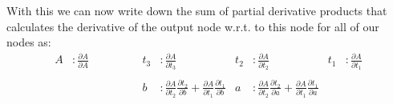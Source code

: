 \vspace{0.5cm}

With this we can now write down the sum of partial derivative products that calculates the derivative of
the output node w.r.t. to this node for all of our nodes as:
\begin{equation}
    \begin{aligned}
        A&: \frac{\partial A}{\partial A} & t_3&: \frac{\partial A}{\partial t_3} & t_2&: \frac{\partial A}{\partial t_2} & t_1&: \frac{\partial A}{\partial t_1} \\\\
        \phantom{a}&\phantom{\frac{\partial A}{\partial t_2} \frac{\partial t_2}{\partial a} + \frac{\partial A}{\partial t_1} \frac{\partial t_1}{\partial a}} & b&: \frac{\partial A}{\partial t_2} \frac{\partial t_2}{\partial b} + \frac{\partial A}{\partial t_1} \frac{\partial t_1}{\partial b} & a&: \frac{\partial A}{\partial t_2} \frac{\partial t_2}{\partial a} + \frac{\partial A}{\partial t_1} \frac{\partial t_1}{\partial a}
    \end{aligned}
\end{equation}

\newpage

